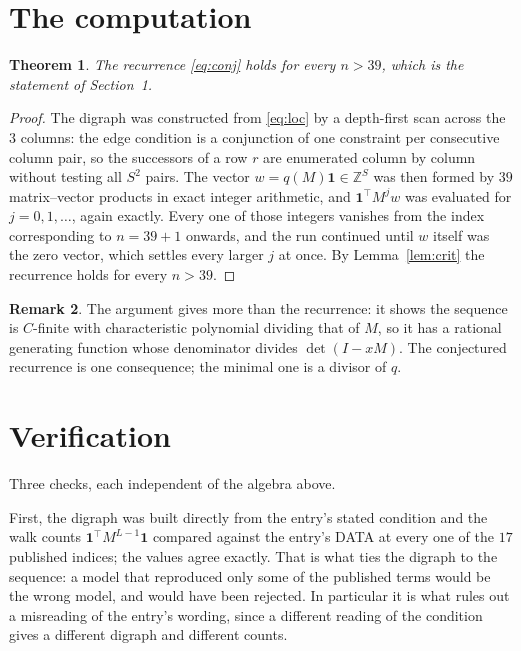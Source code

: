 \documentclass[11pt,a4paper]{article}
\theoremstyle{plain}
\newtheorem{theorem}{Theorem}
\theoremstyle{definition}
\newtheorem{remark}[theorem]{Remark}
\begin{document}
\section{The computation}

\begin{theorem}
The recurrence \eqref{eq:conj} holds for every $n>39$, which is the statement of
Section~1.
\end{theorem}

\begin{proof}
The digraph was constructed from \eqref{eq:loc} by a depth-first scan across the $3$
columns: the edge condition is a conjunction of one constraint per consecutive column
pair, so the successors of a row $r$ are enumerated column by column without testing all
$S^2$ pairs. The vector $w=q(M)\mathbf{1}\in\mathbb{Z}^{S}$ was then formed by $39$
matrix--vector products in exact integer arithmetic, and $\mathbf{1}^{\!\top}M^{j}w$ was
evaluated for $j=0,1,\dots$, again exactly. Every one of those integers vanishes from the
index corresponding to $n=39+1$ onwards, and the run continued until $w$ itself was the
zero vector, which settles every larger $j$ at once. By Lemma~\ref{lem:crit} the recurrence
holds for every $n>39$.
\end{proof}

\begin{remark}
The argument gives more than the recurrence: it shows the sequence is $C$-finite with
characteristic polynomial dividing that of $M$, so it has a rational generating function
whose denominator divides $\det(I-xM)$. The conjectured recurrence is one consequence; the
minimal one is a divisor of $q$.
\end{remark}

\section{Verification}

Three checks, each independent of the algebra above.

First, the digraph was built directly from the entry's stated condition and the walk counts
$\mathbf{1}^{\!\top}M^{L-1}\mathbf{1}$ compared against the entry's DATA at
every one of the $17$ published indices; the values agree exactly. That is what ties
the digraph to the sequence: a model that reproduced only some of the published terms would
be the wrong model, and would have been rejected. In particular it is what rules out a
misreading of the entry's wording, since a different reading of the condition gives a
different digraph and different counts.
\end{document}
